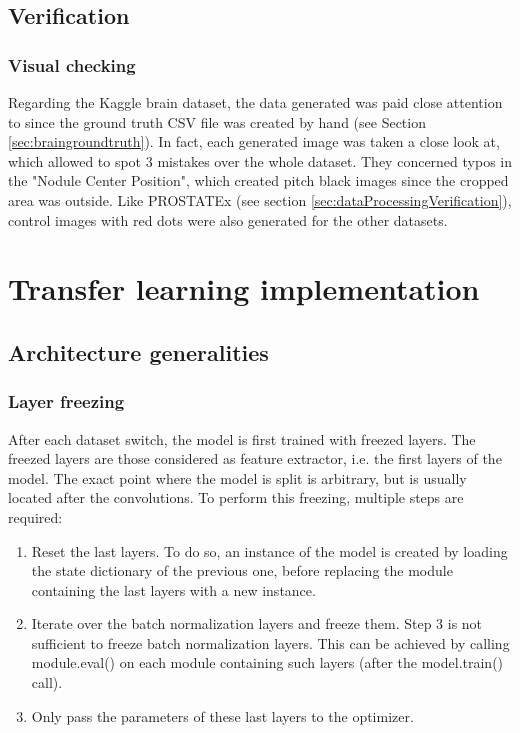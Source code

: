 \subsection{Verification}
\subsubsection{Visual checking}
\setlength{\marginparwidth}{3cm}\leavevmode {}Regarding the Kaggle brain dataset, the data generated was paid close attention to since the ground truth CSV file was created by hand (see Section \ref{sec:braingroundtruth}). In fact, each generated image was taken a close look at, which allowed to spot 3 mistakes over the whole dataset. They concerned typos in the "Nodule Center Position", which created pitch black images since the cropped area was outside.
Like PROSTATEx (see section \ref{sec:dataProcessingVerification}), control images with red dots were also generated for the other datasets. 


\section{Transfer learning implementation}
\subsection{Architecture generalities}
\subsubsection{Layer freezing}
\setlength{\marginparwidth}{3cm}\leavevmode {}After each dataset switch, the model is first trained with freezed layers. The freezed layers are those considered as feature extractor, i.e. the first layers of the model. The exact point where the model is split is arbitrary, but is usually located after the convolutions. To perform this freezing, multiple steps are required:
\begin{enumerate}
	\item Reset the last layers. To do so, an instance of the model is created by loading the state dictionary of the previous one, before replacing the module containing the last layers with a new instance. 
	\item Iterate over the batch normalization layers and freeze them. Step 3 is not sufficient to freeze batch normalization layers. This can be achieved by calling module.eval() on each module containing such layers (after the model.train() call). 
	\item Only pass the parameters of these last layers to the optimizer.
\end{enumerate}

